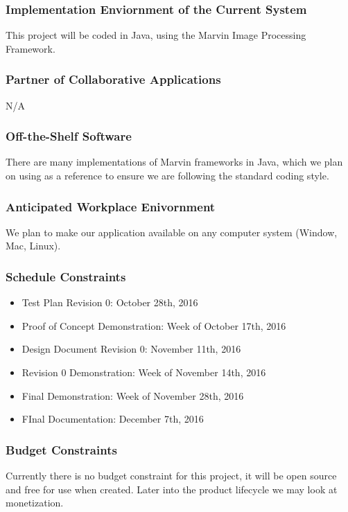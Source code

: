 \documentclass[12pt, titlepage]{article}
\begin{document}
\subsubsection{Implementation Enviornment of the Current System}

This project will be coded in Java, using the Marvin Image Processing Framework.

\subsubsection{Partner of Collaborative Applications}

N/A

\subsubsection{Off-the-Shelf Software}

There are many implementations of Marvin frameworks in Java, which we plan on using as a reference to ensure we are following the standard coding style.

\subsubsection{Anticipated Workplace Enivornment}

We plan to make our application available on any computer system (Window, Mac, Linux).

\subsubsection{Schedule Constraints}

\begin{itemize}
  \item Test Plan Revision 0: October 28th, 2016
  \item Proof of Concept Demonstration: Week of October 17th, 2016
  \item Design Document Revision 0: November 11th, 2016
  \item Revision 0 Demonstration: Week of November 14th, 2016
  \item Final Demonstration: Week of November 28th, 2016
  \item FInal Documentation: December 7th, 2016
\end{itemize}

\subsubsection{Budget Constraints}
Currently there is no budget constraint for this project, it will be open source and free for use when created. Later into the product lifecycle we may look at monetization.
\end{document}
